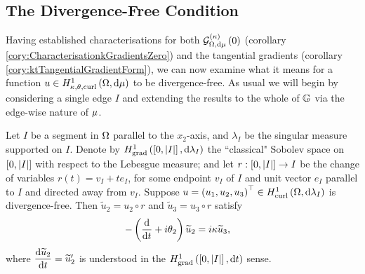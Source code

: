 \subsection{The Divergence-Free Condition} \label{sec:ktDivFree}
Having established characterisations for both $\mathcal{G}_{ \Omega, \mathrm{d}\mu}^{(\kappa)}\left( 0 \right)$ (corollary \ref{cory:CharacterisationkGradientsZero}) and the tangential gradients (corollary \ref{cory:ktTangentialGradientForm}), we can now examine what it means for a function $u\in H^1_{\kappa,\theta,\mathrm{curl}}\left( \Omega, \mathrm{d}\mu \right)$ to be divergence-free.
As usual we will begin by considering a single edge $I$ and extending the results to the whole of $\mathbb{G}$ via the edge-wise nature of $\mu$.
\begin{lemma} \label{lem:DivFreeParallelSegment}
	Let $I$ be a segment in $\Omega$ parallel to the $x_2$-axis, and $\lambda_I$ be the singular measure supported on $I$.
	Denote by $H^1_\mathrm{grad}\left( \left[ 0,\left\lvert I \right\rvert \right], \mathrm{d}\lambda_I \right)$ the ``classical" Sobolev space on $\left[ 0,\left\lvert I \right\rvert \right]$ with respect to the Lebesgue measure; and let $r:\left[ 0,\left\lvert I \right\rvert \right]\rightarrow I$ be the change of variables $r(t)= v_I + t e_I$, for some endpoint $v_I$ of $I$ and unit vector $e_I$ parallel to $I$ and directed away from $v_I$.
	Suppose $u=\left( u_1, u_2, u_3 \right)^\top\in H^1_\mathrm{curl}\left( \Omega, \mathrm{d}\lambda_I \right)$ is divergence-free.
	Then $\widetilde{u}_2 = u_2 \circ r$ and $\widetilde{u}_3 = u_3 \circ r$ satisfy
	\begin{align*}
		-\left( \dfrac{\mathrm{d}}{\mathrm{d}t} + i\theta_2 \right)\widetilde{u}_2 &= i\kappa\widetilde{u}_3,
	\end{align*}
	where $\dfrac{\mathrm{d}\widetilde{u}_2}{\mathrm{d}t} = \widetilde{u}'_2$ is understood in the $H^1_\mathrm{grad}\left( \left[ 0,\left\lvert I \right\rvert \right], \mathrm{d}t \right)$ sense.
\end{lemma}
